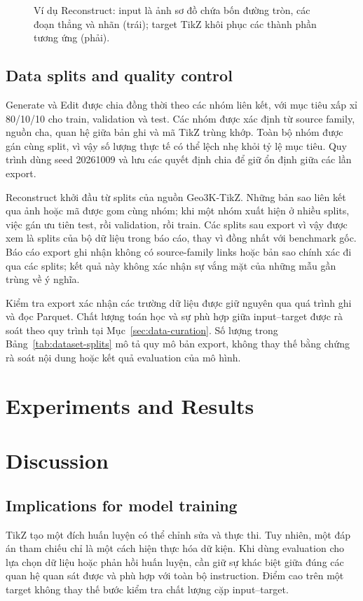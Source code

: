\documentclass[a4paper,12pt]{article}
\begin{document}
\begin{figure}[htbp]
\begin{minipage}[t]{.47\linewidth}
{
}
\end{minipage}
\caption[Reconstruct example: a diagram with four circles]{Ví dụ Reconstruct: input là ảnh sơ đồ chứa bốn đường tròn, các đoạn thẳng và nhãn (trái); target TikZ khôi phục các thành phần tương ứng (phải).}
\label{fig:dataset-reconstruct}
\end{figure}

\subsection{Data splits and quality control}
Generate và Edit được chia đồng thời theo các nhóm liên kết, với mục tiêu xấp xỉ 80/10/10 cho train, validation và test. Các nhóm được xác định từ source family, nguồn cha, quan hệ giữa bản ghi và mã TikZ trùng khớp. Toàn bộ nhóm được gán cùng split, vì vậy số lượng thực tế có thể lệch nhẹ khỏi tỷ lệ mục tiêu. Quy trình dùng seed 20261009 và lưu các quyết định chia để giữ ổn định giữa các lần export.

Reconstruct khởi đầu từ splits của nguồn Geo3K-TikZ. Những bản sao liên kết qua ảnh hoặc mã được gom cùng nhóm; khi một nhóm xuất hiện ở nhiều splits, việc gán ưu tiên test, rồi validation, rồi train. Các splits sau export vì vậy được xem là splits của bộ dữ liệu trong báo cáo, thay vì đồng nhất với benchmark gốc. Báo cáo export ghi nhận không có source-family links hoặc bản sao chính xác đi qua các splits; kết quả này không xác nhận sự vắng mặt của những mẫu gần trùng về ý nghĩa.

Kiểm tra export xác nhận các trường dữ liệu được giữ nguyên qua quá trình ghi và đọc Parquet. Chất lượng toán học và sự phù hợp giữa input--target được rà soát theo quy trình tại Mục~\ref{sec:data-curation}. Số lượng trong Bảng~\ref{tab:dataset-splits} mô tả quy mô bản export, không thay thế bằng chứng rà soát nội dung hoặc kết quả evaluation của mô hình.


\section{Experiments and Results}

\section{Discussion}
\label{sec:discussion}
\subsection{Implications for model training}
TikZ tạo một đích huấn luyện có thể chỉnh sửa và thực thi. Tuy nhiên, một đáp án tham chiếu chỉ là một cách hiện thực hóa dữ kiện. Khi dùng evaluation cho lựa chọn dữ liệu hoặc phản hồi huấn luyện, cần giữ sự khác biệt giữa đúng các quan hệ quan sát được và phù hợp với toàn bộ instruction. Điểm cao trên một target không thay thế bước kiểm tra chất lượng cặp input--target.
\end{document}
